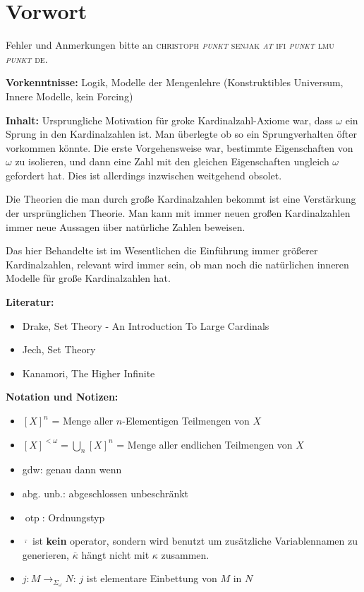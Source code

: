 \documentclass[a4paper,fontsize=11pt]{scrartcl}
\newcommand{\otp}{\operatorname{otp}}
\begin{document}
\flushleft
\section*{Vorwort}
Fehler und Anmerkungen bitte an \textsc{christoph {\it punkt} senjak {\it at} ifi {\it punkt} lmu {\it punkt} de}.

{\bf Vorkenntnisse:} Logik, Modelle der Mengenlehre (Konstruktibles
Universum, Innere Modelle, kein Forcing)

{\bf Inhalt:} Ursprungliche Motivation für groke Kardinalzahl-Axiome
war, dass $\omega$ ein Sprung in den Kardinalzahlen ist. Man überlegte
ob so ein Sprungverhalten öfter vorkommen könnte. Die erste
Vorgehensweise war, bestimmte Eigenschaften von $\omega$ zu isolieren,
und dann eine Zahl mit den gleichen Eigenschaften ungleich $\omega$
gefordert hat. Dies ist allerdings inzwischen weitgehend obsolet.

Die Theorien die man durch große Kardinalzahlen bekommt ist eine
Verstärkung der ursprünglichen Theorie. Man kann mit immer neuen
großen Kardinalzahlen immer neue Aussagen über natürliche Zahlen
beweisen.

Das hier Behandelte ist im Wesentlichen die Einführung immer größerer
Kardinalzahlen, relevant wird immer sein, ob man noch die natürlichen
inneren Modelle für große Kardinalzahlen hat.

{\bf Literatur:}
\begin{itemize}
  \item Drake, Set Theory - An Introduction To Large Cardinals
  \item Jech, Set Theory
  \item Kanamori, The Higher Infinite
\end{itemize}

{\bf Notation und Notizen:}
\begin{itemize}
  \item $[X]^n$ = Menge aller $n$-Elementigen Teilmengen von $X$
  \item $[X]^{<\omega} = \bigcup_n[X]^n$ = Menge aller endlichen
    Teilmengen von $X$
  \item gdw: genau dann wenn
  \item abg. unb.: abgeschlossen unbeschränkt
  \item $\otp$: Ordnungstyp
  \item $\overline{\cdot}$ ist {\bf kein} operator, sondern wird
    benutzt um zusätzliche Variablennamen zu generieren,
    $\overline{\kappa}$ hängt nicht mit $\kappa$ zusammen.
  \item $j:M\rightarrow_{\Sigma_\omega} N$: $j$ ist elementare
    Einbettung von $M$ in $N$
\end{itemize}
\end{document}
